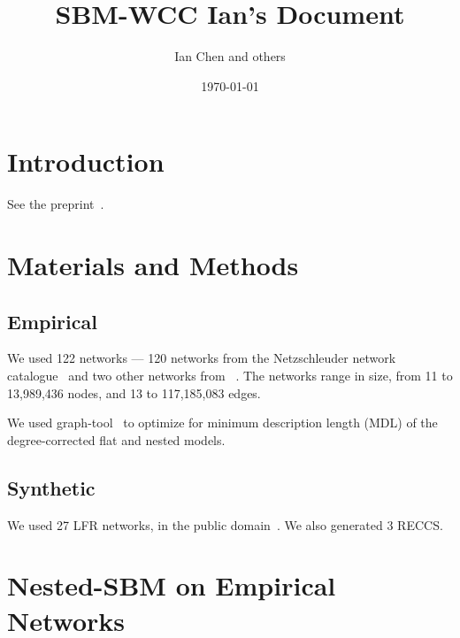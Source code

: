 \documentclass[aps,pre,superscriptaddress]{article}
\begin{document}

\title{SBM-WCC Ian's Document}
\author{Ian Chen and others}
\date{\today}
\maketitle

\section{Introduction}
See the preprint~\cite{Park25-02}.

\section{Materials and Methods}

\subsection{Empirical}
We used 122 networks --- 120 networks from the Netzschleuder network catalogue~\cite{Netzschleuder} and two other networks from ~\cite{Park24-11}.
The networks range in size, from 11 to 13,989,436 nodes, and 13 to 117,185,083 edges.

We used graph-tool~\cite{graph-tool} to optimize for minimum description length (MDL) of the degree-corrected flat and nested models.

\subsection{Synthetic}
We used 27 LFR networks, in the public domain~\cite{park24-11}. We also generated 3 RECCS.

\section{Nested-SBM on Empirical Networks}
\end{document}

